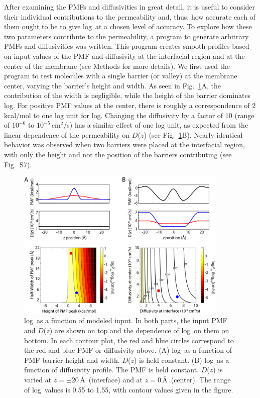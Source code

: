   \par After examining the PMFs and diffusivities in great detail, it is useful to consider their individual contributions to the permeability and, thus, how accurate each of them ought to be to give log\perm~at a chosen level of accuracy.  To explore how these two parameters contribute to the permeability, a program to generate arbitrary PMFs and diffusivities was written.  This program creates smooth profiles based on input values of the PMF and diffusivity at the interfacial region and at the center of the membrane (see Methods for more details).  We first used the program to test molecules with a single barrier (or valley) at the membrane center, varying the barrier's height and width.  As seen in Fig.~\ref{fig:models}A, the contribution of the width is negligible, while the height of the barrier dominates log\perm.  For positive PMF values
 at the center, there is roughly a correspondence of 2\,kcal/mol to one log unit for log\perm.  Changing the diffusivity by a factor of 10 (range of $10^{-6}$ to $10^{-5}$\,cm$^2$/s) has a similar effect of one log unit, as expected from the linear dependence of the permeability on $D$($z$) (see Fig.~\ref{fig:models}B).  Nearly identical behavior was observed when two barriers were placed at the interfacial region, with only the height and not the position of the barriers contributing (see Fig.~S7).

\begin{figure}[htbp]
\begin{center}
	\includegraphics[width=0.9\textwidth]{Figures/models}
	\caption{log\perm~as a function of modeled input.  In both parts, the input PMF and $D$($z$) are shown on top and the dependence of log\perm~on them on bottom.  In each contour plot, the red and blue circles correspond to the red and blue PMF or diffusivity above.  (A) log\perm~as a function of PMF barrier height and width.  $D$($z$) is held constant.  (B) log\perm~as a function of diffusivity profile.  The PMF is held constant.  $D$($z$) is varied at $z=\pm 20$\,\AA~(interface) and at $z=0$\,\AA~(center).  The range of log\perm~values is 0.55 to 1.55, with contour values given in the figure.}
	\label{fig:models}
\end{center}
\end{figure}

